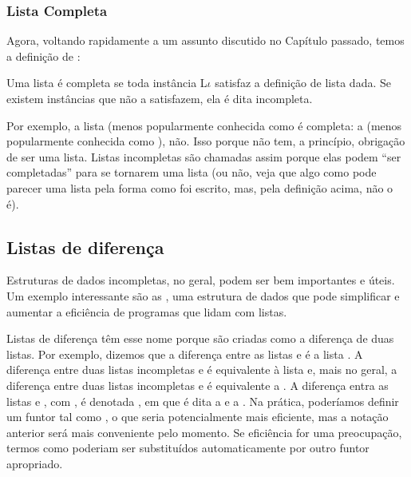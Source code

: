 \subsubsection{Lista Completa}

Agora, voltando rapidamente a um assunto discutido no Capítulo
passado, temos a definição de :

\begin{definition} Uma lista  é completa se toda instância
  L$\iota$ satisfaz a definição de lista dada. Se existem instâncias
  que não a satisfazem, ela é dita incompleta. 
\end{definition}

Por exemplo, a lista \codigo{[a,b,c]} (menos popularmente conhecida
como   é completa: a
\codigo{[a,b|Xs]} (menos popularmente conhecida como 
), não. Isso porque  não tem, a princípio,
obrigação de ser uma lista. Listas incompletas são chamadas assim
porque elas podem ``ser completadas'' para se tornarem uma lista (ou
não, veja que algo como \codigo{[a|b]} pode parecer uma lista pela
forma como foi escrito, mas, pela definição acima, não o é).



\subsection{Listas de diferença}

Estruturas de dados incompletas, no geral, podem ser bem importantes e
úteis. Um exemplo interessante são as ,
uma estrutura de dados que pode simplificar e aumentar a eficiência de
programas que lidam com listas.

Listas de diferença têm esse nome porque são criadas como a diferença
de duas listas. Por exemplo, dizemos que a diferença entre as listas
\codigo{[a,b,c]} e \codigo{[c]} é a lista \codigo{[a,b]}. A diferença
entre duas listas incompletas \codigo{[a,b|Xs]} e  é
equivalente à lista \codigo{[a,b]} e, mais no geral, a diferença entre
duas listas incompletas \codigo{[$x_0$, ...,$x_i$|Xs]} e  é
equivalente a \codigo{[$x_0$, ...,$x_i$]}.  A diferença entra as
listas  e , com , é denotada
, em que  é dita a  e
 a . Na prática, poderíamos definir um
funtor tal como , o que seria potencialmente
mais eficiente, mas a notação anterior será mais conveniente pelo
momento. Se eficiência for uma preocupação, termos como
 poderiam ser substituídos automaticamente por
outro funtor apropriado.

